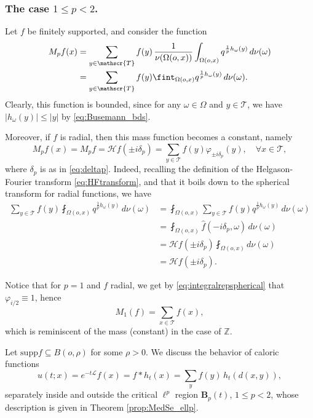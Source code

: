 \documentclass[11pt,a4paper,reqno]{amsart}
\renewcommand\mathcal{\mathscr}
\theoremstyle{plain}
\theoremstyle{remark}
\theoremstyle{definition}
\theoremstyle{remark}
\numberwithin{equation}{section}
\newcommand\supp{\mathrm{supp}}
\def\int{\intop\nolimits}
\begin{document}
	\subsubsection{The case $1\leq p< 2$.} Let $f$ be finitely supported, and consider the function
	\begin{align}\label{eq:massfct1to2}
		M_pf(x)&=\sum_{y\in \mathcal{T}} f(y) \,\frac{1}{\nu(\Omega(o,x))} \int_{\Omega(o,x)}q^{\frac{1}{p}h_{\omega}(y)}\, d\nu(\omega) \notag\\
		&=\sum_{y\in \mathcal{T}} f(y) \fint _{\Omega(o,x)}q^{\frac{1}{p}h_{\omega}(y)}\, d\nu(\omega).
	\end{align} 
	Clearly, this function is bounded, since for any $\omega\in \Omega$ and $y\in \mathcal{T}$, we have $|h_{\omega}(y)|\leq |y|$ by \eqref{eq:Busemann_bds}.
	
	
	Moreover, if $f$ is radial, then this mass function becomes a constant, namely
	$$M_pf(x)=M_pf=\mathcal{H}f(\pm i\delta_p)=\sum_{y\in \mathcal{T}}f(y)\varphi_{\pm i\delta_p}(y), \quad \forall x\in \mathcal{T},$$
	where $\delta_p$ is as in \eqref{eq:deltap}. Indeed, recalling the definition of the Helgason-Fourier transform \eqref{eq:HFtransform}, and that it boils down to the spherical transform for radial functions, we have
	\begin{align*}
		\sum_{y\in \mathcal{T}} f(y) \fint _{\Omega(o,x)}q^{\frac{1}{p}h_{\omega}(y)}\, d\nu(\omega)&= \fint _{\Omega(o,x)}\sum_{y\in \mathcal{T}} f(y)q^{\frac{1}{p}h_{\omega}(y)}\,  d\nu(\omega)\\
		&=\fint _{\Omega(o,x)}\widehat{f}(-i\delta_p, \omega)\,  d\nu(\omega) \\
		&=\mathcal{H}f(\pm i\delta_p)\fint _{\Omega(o,x)}d\nu(\omega)\\
		&=\mathcal{H}f(\pm i\delta_p).
	\end{align*}
	
	Notice that for $p=1$ and $f$ radial, we get by \eqref{eq:integralrepspherical} that $\varphi_{i/2}\equiv 1$, hence
	\[
	M_1(f)=\sum_{x\in \mathcal{T}}f(x),
	\]
	which is reminiscent of the mass (constant) in the case of $\mathbb{Z}$.
	

	Let $\supp f \subseteq B(o,\rho)$ for some $\rho>0$. We discuss the behavior of caloric functions 
	\[
	u(t;x)=e^{-t\mathcal{L}}f(x)=f\ast h_t(x)= \sum_yf(y) \, h_t(d(x,y)),
	\]
	 separately inside and outside the critical $\ell^p$ region $\textbf{B}_p(t)$, $1\leq p <2$, whose description is given in Theorem \ref{prop:MedSe_ellp}. 
	
	
	
\end{document}
